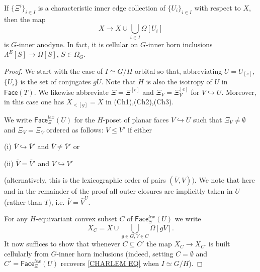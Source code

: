 \documentclass[a4paper,10pt,draft]{article}%
\begin{document}
\begin{lemma}\label{CHAREDGE LEM}
If $\{\Xi^i\}_{i \in I}$ is a characteristic inner edge collection of $\{U_i\}_{i\in I}$ with respect to $X$, then the map
\begin{equation}\label{CHARLEM EQ}
	X \to X \cup \bigcup_{i \in I} \Omega[U_i]
\end{equation}
is $G$-inner anodyne. In fact, it is cellular on $G$-inner horn inclusions $\Lambda^E[S] \to \Omega[S]$, $S \in \Omega_G$.
\end{lemma}


\begin{proof}
We start with the case of $I \simeq G/H$ orbital so that, abbreviating $U = U_{[e]}$, $\{U_i\}$ is the set of conjugates $gU$. 
Note that $H$ is also the isotropy of $U$ in $\mathsf{Face}(T)$.
We likewise abbreviate $\Xi = \Xi^{[e]}$ and
$\Xi_V = \Xi_V^{[e]}$ for $V \hookrightarrow U$.
Moreover, in this case one has $X_{<[g]}=X$ in (Ch1),(Ch2),(Ch3).

We write $\mathsf{Face}_{\Xi}^{lex}(U)$
for the $H$-poset of planar faces $V \hookrightarrow U$
such that $\Xi_V \neq \emptyset$ and $\Xi_V = \Xi_{\bar{V}}$
ordered as follows: 
$V \leq V'$ if either
	\begin{inparaenum}
		\item[(i)] $\bar{V} \hookrightarrow \bar{V}'$ and 
		$\bar{V} \neq \bar{V}'$ or
		\item[(ii)] $\bar{V} = \bar{V}'$ and
		$V \hookrightarrow V'$
	\end{inparaenum}
(alternatively, this is the lexicographic order of pairs $(\bar{V},V))$.
We note that here and in the remainder of the proof all outer closures are implicitly taken in $U$ (rather than $T$), i.e. 
$\bar{V}=\bar{V}^U$.

For any $H$-equivariant convex subset $C$ of $\mathsf{Face}_{\Xi}^{lex}(U)$ we write
\[
X_C = 
X \cup \bigcup_{g\in G,V \in C} \Omega[gV].
\]
It now suffices to show that whenever
$C \subseteq C'$
the map 
$X_C \to X_{C'}$ is built cellularly from 
$G$-inner horn inclusions
(indeed, setting $C=\emptyset$ and 
$C'=\mathsf{Face}_{\Xi}^{lex}(U)$ recovers \eqref{CHARLEM EQ}
when $I \simeq G/H$).


\end{proof}
\end{document}
